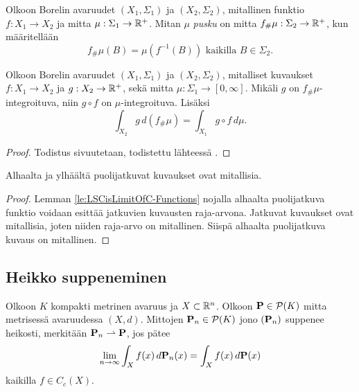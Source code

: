 \documentclass[12pt,oneside,a4paper]{amsbook} %
\begin{document}
\begin{definition}
    Olkoon Borelin avaruudet $(X_1, \Sigma_1)$ ja $(X_2, \Sigma_2)$, mitallinen funktio $f:X_1 \to X_2$ ja mitta $\mu: \Sigma_1 \to \R^+$. Mitan $\mu$ \textit{pusku} on mitta $f_\#\mu: \Sigma_2 \to \R^+$, kun määritellään
    $$f_\# \mu (B) = \mu(f^{-1}(B)) \text{ kaikilla } B\in \Sigma_2.$$
\end{definition}

\begin{theorem}\label{thm:push-cov}
    Olkoon Borelin avaruudet $(X_1, \Sigma_1)$ ja $(X_2, \Sigma_2)$, mitalliset kuvaukset $f: X_1 \to X_2$ ja $g: X_2 \to \R^+$, sekä mitta $\mu:\Sigma_1 \to [0, \infty]$. Mikäli $g$ on $f_\#\mu$-integroituva, niin  $g \circ f$ on $\mu$-integroituva. Lisäksi
    \begin{equation*}
        \int_{X_2} g \, d(f_{\#} \mu) = \int_{X_1} g \circ f \, d\mu.
    \end{equation*}
\end{theorem}
\begin{proof}
Todistus sivuutetaan, todistettu lähteessä \cite[s. 190]{bogachev}.
\end{proof}

\begin{corollary}\label{co:LSCimpliesMeasurable}
    Alhaalta ja ylhäältä puolijatkuvat kuvaukset ovat mitallisia.
\end{corollary}
\begin{proof}
    Lemman \ref{le:LSCisLimitOfC-Functions} nojalla alhaalta puolijatkuva funktio voidaan esittää jatkuvien kuvausten raja-arvona. Jatkuvat kuvaukset ovat mitallisia, joten niiden raja-arvo on mitallinen. Siispä alhaalta puolijatkuva kuvaus on mitallinen. 
\end{proof}

\subsection{Heikko suppeneminen}

\begin{definition} \label{def:weakConv}
    Olkoon $K$ kompakti metrinen avaruus ja $X\subset \R^n$. Olkoon $\P \in \mathcal{P}(K)$ mitta metrisessä avaruudessa $(X, d)$. Mittojen $\P_n \in \mathcal{P}(K)$ jono $(\P_n)$ suppenee heikosti, merkitään $\P_n \rightharpoonup \P$, jos pätee 
    \begin{equation*}
        \lim_{n\to\infty} \int_X f(x) \, d\P_n (x) = \int_X f(x) \, d\P(x)
    \end{equation*}
    kaikilla $f \in C_c(X)$.
\end{definition}
\end{document}
